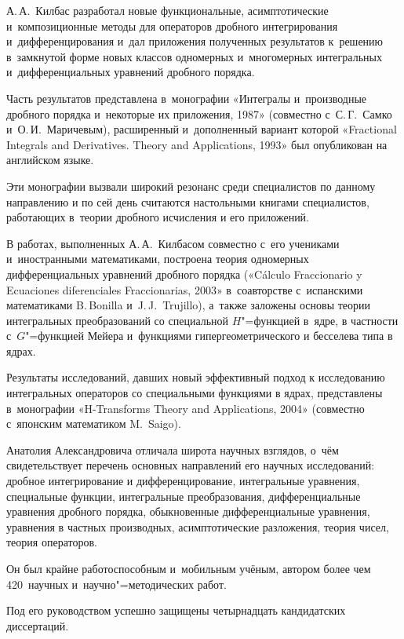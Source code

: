 А.\,А.~Килбас  разработал новые функциональные, асимптотические и~композиционные методы для операторов дробного интегрирования и~дифференцирования и~дал приложения полученных результатов к~решению в~замкнутой форме новых классов одномерных и~многомерных интегральных и~дифференциальных уравнений дробного порядка. 

Часть результатов представлена в~монографии «Интегралы и~производные дробного порядка и~некоторые их приложения, 1987» (совместно с~С.\,Г.~Самко и~О.\,И.~Маричевым), расширенный и~дополненный вариант которой «Fractional Integrals and Derivatives. Theory and Applications, 1993» был опубликован на английском языке. 

Эти монографии вызвали широкий резонанс среди специалистов по данному направлению и по сей день считаются настольными книгами специалистов, работающих в~теории дробного исчисления и его приложений. 



В работах, выполненных А.\,А.~Килбасом совместно с~его учениками и~иностранными математиками, построена теория одномерных дифференциальных уравнений дробного порядка («C\'{a}lculo Fraccionario y Ecuaciones diferen\-ciales Fraccionarias, 2003» в~соавторстве с~испанскими математиками B.\,Bonilla и~J.\,J.~Trujillo), а~также заложены основы теории интегральных преобразований со специальной $H$"=функцией в~ядре, в частности с~$G$"=функцией Мейера и~функциями гипергеометрического и бесселева типа в ядрах. 

Результаты исследований, давших новый эффективный подход к исследованию интегральных операторов со специальными функциями в ядрах, представлены в~монографии «H-Transforms Theory and Applications, 2004» (совместно с~японским математиком M.~Saigo).



Анатолия Александровича отличала широта научных взглядов, о~чём свидетельствует перечень основных направлений его  научных исследований: дробное интегрирование и дифференцирование, интегральные уравнения, специальные функции, интегральные преобразования, дифференциальные уравнения дробного порядка, обыкновенные дифференциальные уравнения, уравнения в частных производных, асимптотические разложения, теория чисел, теория операторов.



Он был крайне работоспособным и~мобильным учёным, автором более чем 420~научных и~научно"=методических работ. 

Под его руководством успешно защищены четырнадцать кандидатских диссертаций. 

